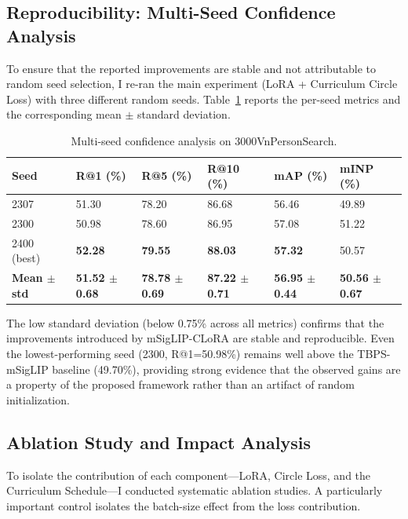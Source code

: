 \documentclass[../main.tex]{subfiles}
\begin{document}
\subsection{Reproducibility: Multi-Seed Confidence Analysis}
\label{sec:multi_seed}

\noindent To ensure that the reported improvements are stable and not attributable to random seed selection, I re-ran the main experiment (LoRA + Curriculum Circle Loss) with three different random seeds. Table~\ref{tab:multi_seed} reports the per-seed metrics and the corresponding mean $\pm$ standard deviation.

\begin{table}[htbp]
\centering
\caption{Multi-seed confidence analysis on 3000VnPersonSearch.}
\label{tab:multi_seed}
\renewcommand{\arraystretch}{1.3}
\begin{tabularx}{\textwidth}{lXXXXX}
\toprule
\textbf{Seed} & \textbf{R@1 (\%)} & \textbf{R@5 (\%)} & \textbf{R@10 (\%)} & \textbf{mAP (\%)} & \textbf{mINP (\%)} \\
\midrule
2307 & 51.30 & 78.20 & 86.68 & 56.46 & 49.89 \\
2300 & 50.98 & 78.60 & 86.95 & 57.08 & 51.22 \\
2400 (best) & \textbf{52.28} & \textbf{79.55} & \textbf{88.03} & \textbf{57.32} & 50.57 \\
\midrule
\textbf{Mean $\pm$ std} & \textbf{51.52 $\pm$ 0.68} & \textbf{78.78 $\pm$ 0.69} & \textbf{87.22 $\pm$ 0.71} & \textbf{56.95 $\pm$ 0.44} & \textbf{50.56 $\pm$ 0.67} \\
\bottomrule
\end{tabularx}
\end{table}

\noindent The low standard deviation (below 0.75\% across all metrics) confirms that the improvements introduced by mSigLIP-CLoRA are stable and reproducible. Even the lowest-performing seed (2300, R@1=50.98\%) remains well above the TBPS-mSigLIP baseline (49.70\%), providing strong evidence that the observed gains are a property of the proposed framework rather than an artifact of random initialization.

\subsection{Ablation Study and Impact Analysis}

\noindent To isolate the contribution of each component---LoRA, Circle Loss, and the Curriculum Schedule---I conducted systematic ablation studies. A particularly important control isolates the batch-size effect from the loss contribution.
\end{document}
